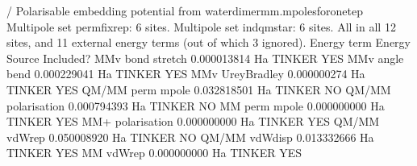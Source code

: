 \documentclass[letterpaper,10pt,english]{sphinxmanual}
\begin{document}
%
\begin{sphinxVerbatim}[commandchars=\\\{\}]
/\PYGZti{}\PYGZti{}\PYGZti{}\PYGZti{}\PYGZti{}\PYGZti{}\PYGZti{}\PYGZti{}\PYGZti{}\PYGZti{}\PYGZti{}\PYGZti{}\PYGZti{}\PYGZti{}\PYGZti{}\PYGZti{}\PYGZti{}\PYGZti{}\PYGZti{}\PYGZti{}\PYGZti{}\PYGZti{}\PYGZti{}\PYGZti{}\PYGZti{}\PYGZti{}\PYGZti{}\PYGZti{}\PYGZti{}\PYGZti{}\PYGZti{}\PYGZti{}\PYGZti{}\PYGZti{}\PYGZti{}\PYGZti{}\PYGZti{}\PYGZti{}\PYGZti{}\PYGZti{}\PYGZti{}\PYGZti{}\PYGZti{}\PYGZti{}\PYGZti{}\PYGZti{}\PYGZti{}\PYGZti{}\PYGZti{}\PYGZti{}\PYGZti{}\PYGZti{}\PYGZti{}\PYGZti{}\PYGZti{}\PYGZti{}\PYGZti{}\PYGZti{}\PYGZti{}\PYGZti{}\PYGZti{}\PYGZti{}\PYGZti{}\PYGZti{}\PYGZti{}\PYGZti{}\PYGZti{}\PYGZti{}\PYGZti{}\PYGZti{}\PYGZti{}\PYGZti{}\PYGZti{}\PYGZti{}\PYGZti{}\PYGZti{}\PYGZti{}\PYGZti{}\PYGZbs{}
\textbar{} Polarisable embedding potential from water\PYGZus{}dimer\PYGZus{}mm.mpoles\PYGZus{}for\PYGZus{}onetep        \textbar{}
\textbar{} Multipole set \PYGZdq{}perm\PYGZus{}fix\PYGZus{}rep\PYGZdq{}: 6 sites.                                       \textbar{}
\textbar{} Multipole set \PYGZdq{}ind\PYGZus{}qmstar\PYGZdq{}: 6 sites.                                         \textbar{}
\textbar{} All in all 12 sites, and 11 external energy terms (out of which 3 \PYGZsh{}ignored). \textbar{}
\textbar{} Energy term                              Energy      Source   Included?      \textbar{}
\textbar{} \PYGZhy{} MMv bond stretch                   0.000013814 Ha  TINKER      YES         \textbar{}
\textbar{} \PYGZhy{} MMv angle bend                     0.000229041 Ha  TINKER      YES         \textbar{}
\textbar{} \PYGZhy{} MMv Urey\PYGZhy{}Bradley                  \PYGZhy{}0.000000274 Ha  TINKER      YES         \textbar{}
\textbar{} \PYGZhy{} \PYGZsh{}QM/MM perm mpole                 \PYGZhy{}0.032818501 Ha  TINKER       NO         \textbar{}
\textbar{} \PYGZhy{} \PYGZsh{}QM/MM polarisation               \PYGZhy{}0.000794393 Ha  TINKER       NO         \textbar{}
\textbar{} \PYGZhy{} MM perm mpole                      0.000000000 Ha  TINKER      YES         \textbar{}
\textbar{} \PYGZhy{} MM+ polarisation                   0.000000000 Ha  TINKER      YES         \textbar{}
\textbar{} \PYGZhy{} \PYGZsh{}QM/MM vdW\PYGZhy{}rep                     0.050008920 Ha  TINKER       NO         \textbar{}
\textbar{} \PYGZhy{} QM/MM vdW\PYGZhy{}disp                    \PYGZhy{}0.013332666 Ha  TINKER      YES         \textbar{}
\textbar{} \PYGZhy{} MM vdW\PYGZhy{}rep                         0.000000000 Ha  TINKER      YES         \textbar{}

\end{sphinxVerbatim}
\end{document}
